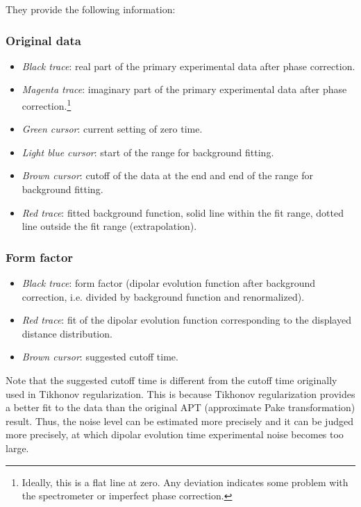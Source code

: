 \documentclass[11pt,a4paper]{article}
\begin{document}
They provide the following information:

\subsubsection*{Original data}
\begin{itemize}
	\item \emph{Black trace}: real part of the primary experimental data after phase correction.
	\item \emph{Magenta trace}: imaginary part of the primary experimental data after phase correction.\footnote{Ideally, this is a flat line at zero. Any deviation indicates some problem with the spectrometer or imperfect phase correction.}
	\item \emph{Green cursor}: current setting of zero time.
	\item \emph{Light blue cursor}: start of the range for background fitting.
  \item \emph{Brown cursor}: cutoff of the data at the end and end of the range for background fitting.
  \item \emph{Red trace}: fitted background function, solid line within the fit range, dotted line outside the fit range (extrapolation). 
\end{itemize}

\subsubsection*{Form factor}
\begin{itemize}
	\item \emph{Black trace}: form factor (dipolar evolution function after background correction, i.e. divided by background function and renormalized).
	\item \emph{Red trace}: fit of the dipolar evolution function corresponding to the displayed distance distribution.
	\item \emph{Brown cursor}: suggested cutoff time.
\end{itemize}

Note that the suggested cutoff time is different from the cutoff time originally used in Tikhonov regularization. This is because Tikhonov regularization provides a better fit to the data than the original APT (approximate Pake transformation) result. Thus, the noise level can be estimated more precisely and it can be judged more precisely, at which dipolar evolution time experimental noise becomes too large.
\end{document}
